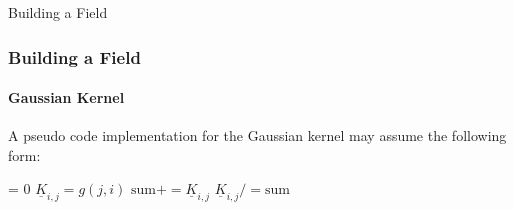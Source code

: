 \documentclass[professionalfont,10pt]{beamer}
\begin{document}
	\begin{frame}[t]{Building a Field}
		\frametitle{Building a Field}
		\framesubtitle{Gaussian Kernel}
		\hskip-0.75cm
		\begin{minipage}[t]{0.2\linewidth}\vspace{-0.5cm}
			\tiny\tableofcontents[currentsection,currentsubsection,hideothersubsections,subsectionstyle=show/shaded]
		\end{minipage}
		\hfill%
		\begin{minipage}[t]{0.86\linewidth}\vspace{-0.5cm}
			\begin{flushleft}
				A pseudo code implementation for the Gaussian kernel may assume the following form:
				\begin{algorithm}[H]
					\begin{algorithmic}[1]
						\STATE {} = 0
						\STATE $\underline{K}_{i, j} = g(j, i)$
						\STATE $\text{sum} += \underline{K}_{i, j}$
						\ENDFOR
						\ENDFOR
						\STATE $\underline{K}_{i, j} /= \text{sum}$
					\end{algorithmic}
					\label{alg:seq}
				\end{algorithm}
			\end{flushleft}
		\end{minipage}
		\vfill%
	\end{frame}
	
\end{document}
